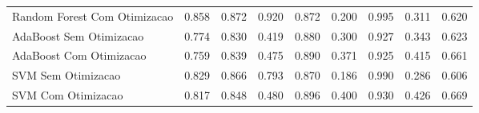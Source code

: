 \begin{table}[H]
\begin{adjustwidth}{ -1in }{ -1in }
\begin{tabular}{lrrrrrrrr}
      Random Forest Com Otimizacao &                        0.858 &                         0.872 &                            0.920 &                            0.872 &                          0.200 &                          0.995 &                                     0.311 &                                 0.620 \\
           AdaBoost Sem Otimizacao &                        0.774 &                         0.830 &                            0.419 &                            0.880 &                          0.300 &                          0.927 &                                     0.343 &                                 0.623 \\
           AdaBoost Com Otimizacao &                        0.759 &                         0.839 &                            0.475 &                            0.890 &                          0.371 &                          0.925 &                                     0.415 &                                 0.661 \\
                SVM Sem Otimizacao &                        0.829 &                         0.866 &                            0.793 &                            0.870 &                          0.186 &                          0.990 &                                     0.286 &                                 0.606 \\
                SVM Com Otimizacao &                        0.817 &                         0.848 &                            0.480 &                            0.896 &                          0.400 &                          0.930 &                                     0.426 &                                 0.669 \\
\bottomrule
\end{tabular}
    \end{adjustwidth}
    \renewcommand{\arraystretch}{1.0} %
\end{table}
